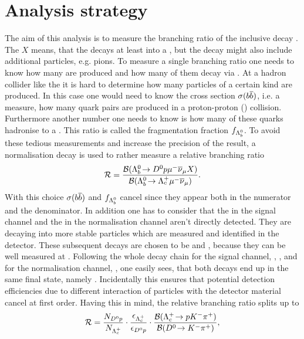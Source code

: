 \chapter{Analysis strategy}
\label{sec:Strategy}
The aim of this analysis is to measure the branching ratio of the inclusive decay \LbToDpmunuX.
The $X$ means, that the \Lb decays at least into a \Dz\proton\mun\neumb, but the decay might also include additional particles, e.g. pions.
To measure a single branching ratio one needs to know how many \Lb are produced and how many of them decay via \LbToDpmunu.
At a hadron collider like the \lhc it is hard to determine how many particles of a certain kind are produced.
In this case one would need to know the \bquark\bquarkbar cross section $\sigma({b}{\overline {{b}}})$, i.e. a measure, how many \bquark\bquarkbar quark pairs are produced in a proton-proton (\proton\proton) collision.
Furthermore another number one needs to know is how many of these \bquark quarks hadronise to a \Lb.
This ratio is called the fragmentation fraction $f_{{{\Lambda}^0_{b}}}$.
To avoid these tedious measurements and increase the precision of the result, a normalisation decay \LbToLcmunu is used to rather measure a relative branching ratio
\begin{align}
	\mathcal{R} =
	\frac{{\cal B}({{\Lambda}^0_{b}}\!\rightarrow {\ensuremath{{D}^0}}{\ensuremath{p}} {\ensuremath{\mu^-}} {\ensuremath{{\overline{\nu}}_\mu}} X)}{{\cal B}({{\Lambda}^0_{b}}\!\rightarrow {\ensuremath{{\Lambda}^+_{c}}} {\ensuremath{\mu^-}}{\ensuremath{{\overline{\nu}}_\mu}})}. \label{eq:R_def}
\end{align}
With this choice $\sigma({b}{\overline {{b}}})$ and $f_{{{\Lambda}^0_{b}}}$ cancel since they appear both in the numerator and the denominator.
In addition one has to consider that the \Dz in the signal channel and the \Lc in the normalisation channel aren't directly detected.
They are decaying into more stable particles which are measured and identified in the detector.
These subsequent decays are chosen to be \DToKpi and \LcTopKpi, because they can be well measured at \lhcb.
Following the whole decay chain for the signal channel, \LbToDpmunuX, \DToKpi, and for the normalisation channel, \LbToLcmunu, \LcTopKpi one easily sees, that both decays end up in the same final state, namely \pKpi\mun\neumb.
Incidentally this ensures that potential detection efficiencies due to different interaction of particles with the detector material cancel at first order.
Having this in mind, the relative branching ratio splits up to
\begin{align}
	\mathcal{R} =
	 \frac{N_{{{D}^0}{p}}}{N_{{{\Lambda}^+_{c}}}}  
	 \cdot \frac{\epsilon_{{{\Lambda}^+_{c}}}}{\epsilon_{{{D}^0}{p}}}
	 \cdot \frac{{\cal B}({{\Lambda}^+_{c}}\!\rightarrow p {{K}^-} {{\pi}^+})}{{\cal B}({{D}^0}\!\rightarrow {\ensuremath{{K}^-}}{\ensuremath{{\pi}^+}})}, \label{eq:R}
\end{align}
